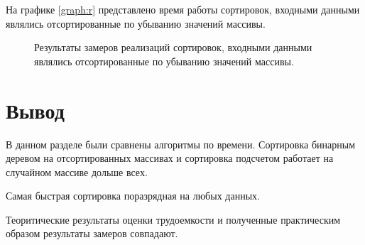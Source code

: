 На графике \ref{graph:r} представлено время работы сортировок, входными данными являлись отсортированные по убыванию значений массивы.

\begin{figure}[ht!]
	\begin{center}
		\captionsetup{singlelinecheck = false, justification=centerfirst}
	\centering
	\caption{Результаты замеров реализаций сортировок, входными данными являлись отсортированные по убыванию значений массивы.}
	\end{center}
	
\end{figure}

\newpage

\section*{Вывод}

В данном разделе были сравнены алгоритмы по времени.
Сортировка бинарным деревом на отсортированных массивах и сортировка подсчетом работает на случайном массиве дольше всех.

Самая быстрая сортировка поразрядная на любых данных.


Теоритические результаты оценки трудоемкости и полученные практическим образом результаты замеров совпадают. 
